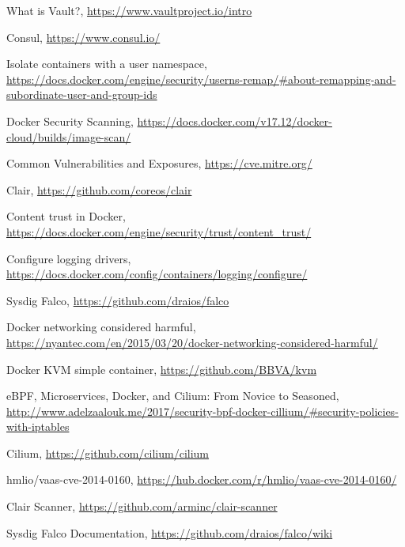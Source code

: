 \documentclass[a4paper,12pt]{article}
\begin{document}
\begin{thebibliography}{99}
What is Vault?, \url{https://www.vaultproject.io/intro}

Consul, \url{https://www.consul.io/}

Isolate containers with a user namespace,
\url{https://docs.docker.com/engine/security/userns-remap/#about-remapping-and-subordinate-user-and-group-ids}

Docker Security Scanning,
\url{https://docs.docker.com/v17.12/docker-cloud/builds/image-scan/}

Common Vulnerabilities and Exposures, \url{https://cve.mitre.org/}

Clair, \url{https://github.com/coreos/clair} 

Content trust in Docker,
\url{https://docs.docker.com/engine/security/trust/content_trust/}

Configure logging drivers,
\url{https://docs.docker.com/config/containers/logging/configure/}

Sysdig Falco, \url{https://github.com/draios/falco}

Docker networking considered harmful,
\url{https://nyantec.com/en/2015/03/20/docker-networking-considered-harmful/}

Docker KVM simple container, \url{https://github.com/BBVA/kvm}

eBPF, Microservices, Docker, and Cilium: From Novice to Seasoned,
\url{http://www.adelzaalouk.me/2017/security-bpf-docker-cillium/#security-policies-with-iptables}

Cilium, \url{https://github.com/cilium/cilium}

hmlio/vaas-cve-2014-0160, \url{https://hub.docker.com/r/hmlio/vaas-cve-2014-0160/}

Clair Scanner, \url{https://github.com/arminc/clair-scanner}

Sysdig Falco Documentation, \url{https://github.com/draios/falco/wiki}

\end{thebibliography}
\end{document}
